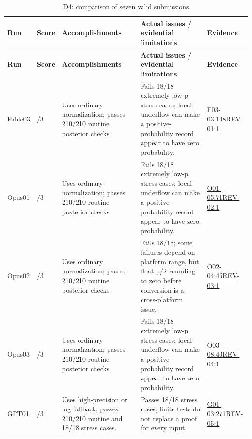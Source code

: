 \documentclass[11pt,a4paper]{article}
\begin{document}
{\fontsize{9.0}{12.6}\selectfont
\setlength{\tabcolsep}{2.5pt}
\begin{longtable}{>{\raggedright\arraybackslash}p{}>{\raggedright\arraybackslash}p{}>{\raggedright\arraybackslash}p{}>{\raggedright\arraybackslash}p{}>{\raggedright\arraybackslash}p{}}
\caption{D4: comparison of seven valid submissions}\\
\toprule
\textbf{Run} & \textbf{Score} & \textbf{Accomplishments} & \textbf{Actual issues /\allowbreak{} evidential limitations} & \textbf{Evidence}\tabularnewline
\midrule
\endfirsthead
\toprule
\textbf{Run} & \textbf{Score} & \textbf{Accomplishments} & \textbf{Actual issues /\allowbreak{} evidential limitations} & \textbf{Evidence}\tabularnewline
\midrule
\endhead
{}Fable03 & 1/\allowbreak{}3 & Uses ordinary normalization; passes 210/\allowbreak{}210 routine posterior checks. & Fails 18/\allowbreak{}18 extremely low-p stress cases; local underflow can make a positive-probability record appear to have zero probability. & \hyperref[src:F03-03]{F03-03:198}\newline \hyperref[src:REV-01]{REV-01:1}\tabularnewline
{}Opus01 & 1/\allowbreak{}3 & Uses ordinary normalization; passes 210/\allowbreak{}210 routine posterior checks. & Fails 18/\allowbreak{}18 extremely low-p stress cases; local underflow can make a positive-probability record appear to have zero probability. & \hyperref[src:O01-05]{O01-05:71}\newline \hyperref[src:REV-02]{REV-02:1}\tabularnewline
{}Opus02 & 1/\allowbreak{}3 & Uses ordinary normalization; passes 210/\allowbreak{}210 routine posterior checks. & Fails 18/\allowbreak{}18; some failures depend on platform range,\allowbreak{} but float p/\allowbreak{}2 rounding to zero before conversion is a cross-platform issue. & \hyperref[src:O02-04]{O02-04:45}\newline \hyperref[src:REV-03]{REV-03:1}\tabularnewline
{}Opus03 & 1/\allowbreak{}3 & Uses ordinary normalization; passes 210/\allowbreak{}210 routine posterior checks. & Fails 18/\allowbreak{}18 extremely low-p stress cases; local underflow can make a positive-probability record appear to have zero probability. & \hyperref[src:O03-08]{O03-08:43}\newline \hyperref[src:REV-04]{REV-04:1}\tabularnewline
{}GPT01 & 3/\allowbreak{}3 & Uses high-precision or log fallback; passes 210/\allowbreak{}210 routine and 18/\allowbreak{}18 stress cases. & Passes 18/\allowbreak{}18 stress cases; finite tests do not replace a proof for every input. & \hyperref[src:G01-03]{G01-03:271}\newline \hyperref[src:REV-05]{REV-05:1}\tabularnewline

\end{longtable}}
\end{document}
